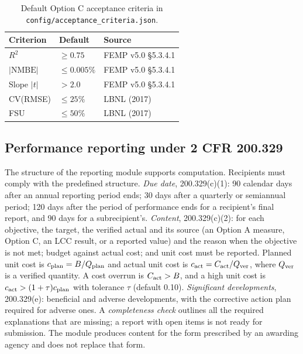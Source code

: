 \documentclass[10pt,twocolumn,letterpaper]{article}
\newcommand{\code}[1]{\texttt{#1}}
\begin{document}
\begin{table}[t]
\captionsetup{justification=raggedright,singlelinecheck=false}
\caption{Default Option C acceptance criteria in \code{config/acceptance\_criteria.json}.}
\label{tab:accept}
\centering\small
\begin{tabular}{@{}lll@{}}
\toprule
Criterion & Default & Source \\
\midrule
$R^2$ & $\geq 0.75$ & FEMP v5.0 \S5.3.4.1 \\
$|\mathrm{NMBE}|$ & $\leq 0.005\%$ & FEMP v5.0 \S5.3.4.1 \\
Slope $|t|$ & $> 2.0$ & FEMP v5.0 \S5.3.4.1 \\
CV(RMSE) & $\leq 25\%$ & LBNL (2017)~\cite{lbnl2017} \\
FSU & $\leq 50\%$ & LBNL (2017)~\cite{lbnl2017} \\
\bottomrule
\end{tabular}
\end{table}

\subsection{Performance reporting under 2 CFR 200.329}

The structure of the reporting module supports computation. Recipients must comply with the predefined structure. \emph{Due date}, 200.329(c)(1): 90 calendar days after an annual reporting period ends; 30 days after a quarterly or semiannual period; 120 days after the period of performance ends for a recipient's final report, and 90 days for a subrecipient's. \emph{Content}, 200.329(c)(2): for each objective, the target, the verified actual and its source (an Option A measure, Option C, an LCC result, or a reported value) and the reason when the objective is not met; budget against actual cost; and unit cost must be reported. Planned unit cost is $c_{\rm plan}=B/Q_{\rm plan}$ and actual unit cost is $c_{\rm act}=C_{\rm act}/Q_{\rm ver}$, where $Q_{\rm ver}$ is a verified quantity. A cost overrun is $C_{\rm act}>B$, and a high unit cost is $c_{\rm act}>(1+\tau)c_{\rm plan}$ with tolerance $\tau$ (default 0.10). \emph{Significant developments}, 200.329(e): beneficial and adverse developments, with the corrective action plan required for adverse ones. A \emph{completeness check} outlines all the required explanations that are missing; a report with open items is not ready for submission. The module produces content for the form prescribed by an awarding agency and does not replace that form.
\end{document}
